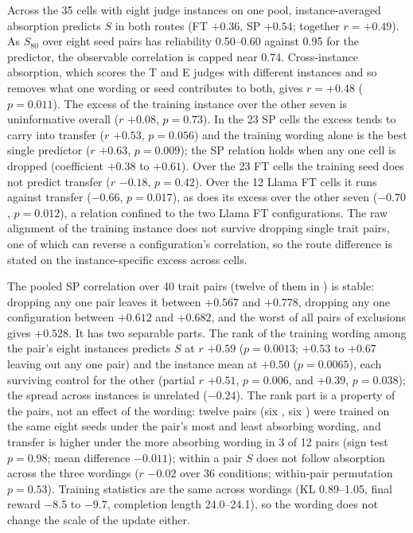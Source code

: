 
Across the 35 cells with eight judge instances on one pool, instance-averaged absorption predicts $S$ in both routes (FT $+0.36$, SP $+0.54$; together $r = +0.49$). As $S_{80}$ over eight seed pairs has reliability 0.50--0.60 against 0.95 for the predictor, the observable correlation is capped near 0.74. Cross-instance absorption, which scores the T and E judges with different instances and so removes what one wording or seed contributes to both, gives $r = +0.48$ ($p = 0.011$). The excess of the training instance over the other seven is uninformative overall ($r$ $+0.08$, $p = 0.73$). In the 23 SP cells the excess tends to carry into transfer ($r$ $+0.53$, $p = 0.056$) and the training wording alone is the best single predictor ($r$ $+0.63$, $p = 0.009$); the SP relation holds when any one cell is dropped (coefficient $+0.38$ to $+0.61$). Over the 23 FT cells the training seed does not predict transfer ($r$ $-0.18$, $p = 0.42$). Over the 12 Llama FT cells it runs against transfer ($-0.66$, $p = 0.017$), as does its excess over the other seven ($-0.70$, $p = 0.012$), a relation confined to the two Llama FT configurations. The raw alignment of the training instance does not survive dropping single trait pairs, one of which can reverse a configuration's correlation, so the route difference is stated on the instance-specific excess across cells.

The pooled SP correlation over 40 trait pairs (twelve of them in ) is stable: dropping any one pair leaves it between $+0.567$ and $+0.778$, dropping any one configuration between $+0.612$ and $+0.682$, and the worst of all pairs of exclusions gives $+0.528$. It has two separable parts. The rank of the training wording among the pair's eight instances predicts $S$ at $r$ $+0.59$ ($p = 0.0013$; $+0.53$ to $+0.67$ leaving out any one pair) and the instance mean at $+0.50$ ($p = 0.0065$), each surviving control for the other (partial $r$ $+0.51$, $p = 0.006$, and $+0.39$, $p = 0.038$); the spread across instances is unrelated ($-0.24$). The rank part is a property of the pairs, not an effect of the wording: twelve pairs (six , six ) were trained on the same eight seeds under the pair's most and least absorbing wording, and transfer is higher under the more absorbing wording in 3 of 12 pairs (sign test $p = 0.98$; mean difference $-0.011$); within a pair $S$ does not follow absorption across the three wordings ($r$ $-0.02$ over 36 conditions; within-pair permutation $p = 0.53$). Training statistics are the same across wordings (KL 0.89--1.05, final reward $-8.5$ to $-9.7$, completion length 24.0--24.1), so the wording does not change the scale of the update either.

